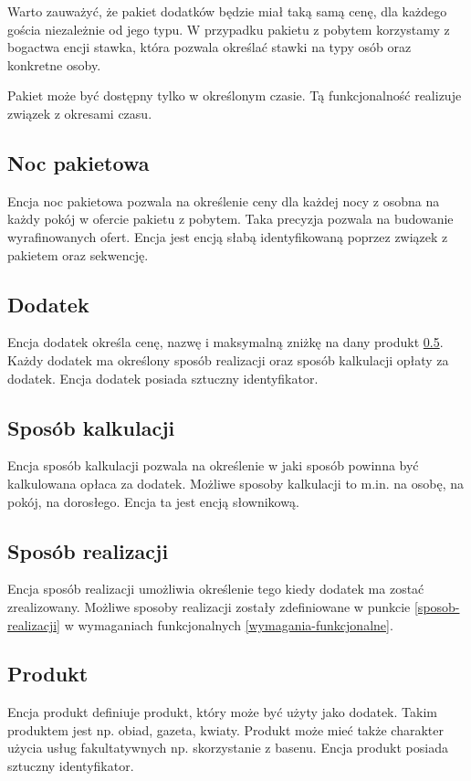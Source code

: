 \documentclass[a4paper,onecolumn,oneside,11pt,wide,floatssmall]{mwrep}
\theoremstyle{definition}
\theoremstyle{plain}%
\theoremstyle{remark}
\begin{document}
Warto zauważyć, że pakiet dodatków będzie miał taką samą cenę, dla każdego gościa niezależnie od jego typu. W przypadku pakietu z pobytem korzystamy z bogactwa encji stawka, która pozwala określać stawki na typy osób oraz konkretne osoby.

Pakiet może być dostępny tylko w określonym czasie. Tą funkcjonalność realizuje związek z okresami czasu.

\subsection{Noc pakietowa}
\label{noc-pakietowa}
Encja noc pakietowa pozwala na określenie ceny dla każdej nocy z osobna na każdy pokój w ofercie pakietu z pobytem. Taka precyzja pozwala na budowanie wyrafinowanych ofert. Encja jest encją słabą identyfikowaną poprzez związek z pakietem oraz sekwencję.

\subsection{Dodatek}
Encja dodatek określa cenę, nazwę i maksymalną zniżkę na dany produkt \ref{model-produkt}. Każdy dodatek ma określony sposób realizacji oraz sposób kalkulacji opłaty za dodatek. Encja dodatek posiada sztuczny identyfikator.

\subsection{Sposób kalkulacji}
Encja sposób kalkulacji pozwala na określenie w jaki sposób powinna być kalkulowana opłaca za dodatek. Możliwe sposoby kalkulacji to m.in. na osobę, na pokój, na dorosłego. Encja ta jest encją słownikową.

\subsection{Sposób realizacji}
Encja sposób realizacji umożliwia określenie tego kiedy dodatek ma zostać zrealizowany. Możliwe sposoby realizacji zostały zdefiniowane w punkcie \ref{sposob-realizacji} w wymaganiach funkcjonalnych \ref{wymagania-funkcjonalne}.

\subsection{Produkt}
\label{model-produkt}
Encja produkt definiuje produkt, który może być użyty jako dodatek. Takim produktem jest np. obiad, gazeta, kwiaty. Produkt może mieć także charakter użycia usług fakultatywnych np. skorzystanie z basenu. Encja produkt posiada sztuczny identyfikator.
\end{document}
